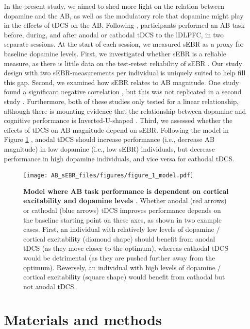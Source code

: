 \documentclass[11pt,]{memoir}
\begin{document}
In the present study, we aimed to shed more light on the relation between dopamine and the AB, as well as the modulatory role that dopamine might play in the effects of tDCS on the AB. Following \textcite{London2015}, participants performed an AB task before, during, and after anodal or cathodal tDCS to the lDLPFC, in two separate sessions. At the start of each session, we measured sEBR as a proxy for baseline dopamine levels. First, we investigated whether sEBR is a reliable measure, as there is little data on the test-retest reliability of sEBR \autocite{Jongkees2016}. Our study design with two sEBR-measurements per individual is uniquely suited to help fill this gap. Second, we examined how sEBR relates to AB magnitude. One study found a significant negative correlation \autocite{Colzato2008}, but this was not replicated in a second study \autocite{Slagter2013}. Furthermore, both of these studies only tested for a linear relationship, although there is mounting evidence that the relationship between dopamine and cognitive performance is Inverted-U-shaped \autocite{Cools2011}. Third, we assessed whether the effects of tDCS on AB magnitude depend on sEBR. Following the model in Figure \ref{fig:AB-sEBR-fig-model} \autocites{Krause2013}{London2015}{Wiegand2016}, anodal tDCS should increase performance (i.e., decrease AB magnitude) in low dopamine (i.e., low sEBR) individuals, but decrease performance in high dopamine individuals, and vice versa for cathodal tDCS.

\begin{figure}
\centering
\texttt{[image: AB\_sEBR\_files/figures/figure\_1\_model.pdf]}
\caption{\label{fig:AB-sEBR-fig-model}\textbf{Model where AB task performance is dependent on cortical excitability \autocite[left,][]{London2015} and dopamine levels \autocite[right,][]{Wiegand2016}}. Whether anodal (red arrows) or cathodal (blue arrows) tDCS improves performance depends on the baseline starting point on these axes, as shown in two example cases. First, an individual with relatively low levels of dopamine / cortical excitability (diamond shape) should benefit from anodal tDCS (as they move closer to the optimum), whereas cathodal tDCS would be detrimental (as they are pushed further away from the optimum). Reversely, an individual with high levels of dopamine / cortical excitability (square shape) would benefit from cathodal but not anodal tDCS.}
\end{figure}



\hypertarget{AB_sEBR-methods}{%
\section{Materials and methods}\label{AB_sEBR-methods}}
\end{document}
